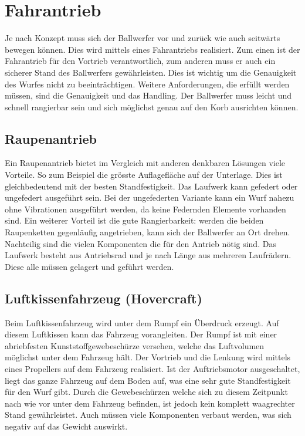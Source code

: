 \section{Fahrantrieb}
Je nach Konzept muss sich der Ballwerfer vor und zurück wie auch seitwärts bewegen können. Dies wird mittels eines Fahrantriebs realisiert. Zum einen ist der Fahrantrieb für den Vortrieb verantwortlich, zum anderen muss er auch ein sicherer Stand des Ballwerfers gewährleisten. Dies ist wichtig um die Genauigkeit des Wurfes nicht zu beeinträchtigen. Weitere Anforderungen, die erfüllt werden müssen, sind die Genauigkeit und das Handling. Der Ballwerfer muss leicht und schnell rangierbar sein und sich möglichst genau auf den Korb ausrichten können. 

\subsection{Raupenantrieb}
Ein Raupenantrieb bietet im Vergleich mit anderen denkbaren Lösungen viele Vorteile. So zum Beispiel die grösste Auflagefläche auf der Unterlage. Dies ist gleichbedeutend mit der besten Standfestigkeit. Das Laufwerk kann gefedert oder ungefedert ausgeführt sein. Bei der ungefederten Variante kann ein Wurf nahezu ohne Vibrationen ausgeführt werden, da keine Federnden Elemente vorhanden sind. Ein weiterer Vorteil ist die gute Rangierbarkeit: werden die beiden Raupenketten gegenläufig angetrieben, kann sich der Ballwerfer an Ort drehen. Nachteilig sind die vielen Komponenten die für den Antrieb nötig sind. Das Laufwerk besteht aus Antriebsrad und je nach Länge aus mehreren Laufrädern. Diese alle müssen gelagert und geführt werden. 
 
\subsection{Luftkissenfahrzeug (Hovercraft)}
Beim Luftkissenfahrzeug wird unter dem Rumpf ein Überdruck erzeugt. Auf diesem Luftkissen kann das Fahrzeug vorangleiten. Der Rumpf ist mit einer abriebfesten Kunststoffgewebeschürze versehen, welche das Luftvolumen möglichst unter dem Fahrzeug hält. Der Vortrieb und die Lenkung wird mittels eines Propellers auf dem Fahrzeug realisiert. Ist der Auftriebsmotor ausgeschaltet, liegt das ganze Fahrzeug auf dem Boden auf, was eine sehr gute Standfestigkeit für den Wurf gibt. Durch die Gewebeschürzen welche sich zu diesem Zeitpunkt nach wie vor unter dem Fahrzeug befinden, ist jedoch kein komplett waagrechter Stand gewährleistet. Auch müssen viele Komponenten verbaut werden, was sich negativ auf das Gewicht auswirkt.

